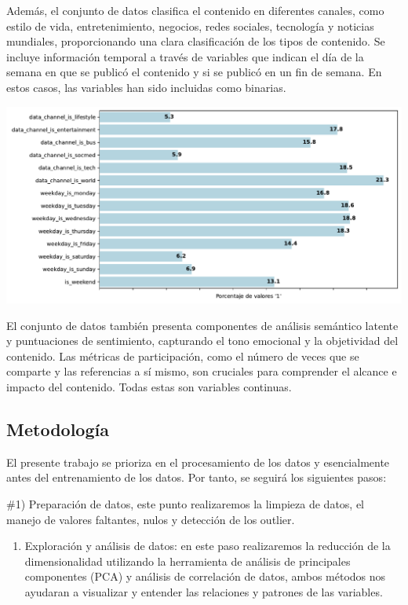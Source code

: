 \documentclass[
  number,
  preprint,
  3p,
  twocolumn]{elsarticle}
\providecommand{\tightlist}{%
  \setlength{\itemsep}{0pt}\setlength{\parskip}{0pt}}\usepackage{longtable,booktabs,array}
\begin{document}
Además, el conjunto de datos clasifica el contenido en diferentes
canales, como estilo de vida, entretenimiento, negocios, redes sociales,
tecnología y noticias mundiales, proporcionando una clara clasificación
de los tipos de contenido. Se incluye información temporal a través de
variables que indican el día de la semana en que se publicó el contenido
y si se publicó en un fin de semana. En estos casos, las variables han
sido incluidas como binarias.

\includegraphics{Articulo_v2_files/figure-pdf/cell-4-output-1.pdf}

El conjunto de datos también presenta componentes de análisis semántico
latente y puntuaciones de sentimiento, capturando el tono emocional y la
objetividad del contenido. Las métricas de participación, como el número
de veces que se comparte y las referencias a sí mismo, son cruciales
para comprender el alcance e impacto del contenido. Todas estas son
variables continuas.

\subsection{Metodología}\label{metodologuxeda}

El presente trabajo se prioriza en el procesamiento de los datos y
esencialmente antes del entrenamiento de los datos. Por tanto, se
seguirá los siguientes pasos:

\#1) Preparación de datos, este punto realizaremos la limpieza de datos,
el manejo de valores faltantes, nulos y detección de los outlier.

\begin{enumerate}
\def\labelenumi{\arabic{enumi})}
\setcounter{enumi}{1}
\tightlist
\item
  Exploración y análisis de datos: en este paso realizaremos la
  reducción de la dimensionalidad utilizando la herramienta de análisis
  de principales componentes (PCA) y análisis de correlación de datos,
  ambos métodos nos ayudaran a visualizar y entender las relaciones y
  patrones de las variables.
\end{enumerate}
\end{document}
